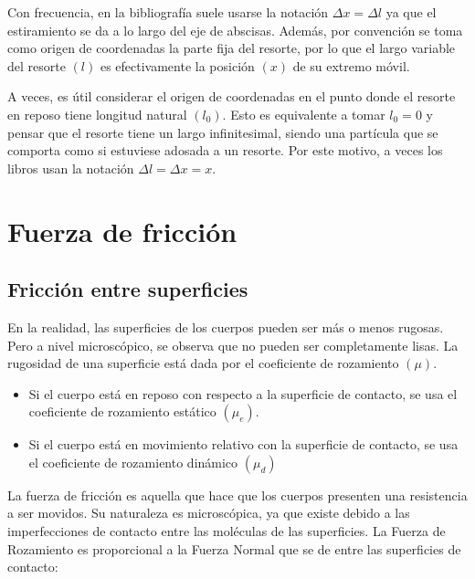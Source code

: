 \documentclass[a5paper,12pt,twoside]{book}
\begin{document}
Con frecuencia, en la bibliografía suele usarse la notación $\Delta x=\Delta l$ ya que el estiramiento se da a lo largo del eje de abscisas. Además, por convención se toma como origen de coordenadas la parte fija del resorte, por lo que el largo variable del resorte $(l)$ es efectivamente la posición $(x)$ de su extremo móvil.

A veces, es útil considerar el origen de coordenadas en el punto donde el resorte en reposo tiene longitud natural $(l_0)$. Esto es equivalente a tomar $l_0 = 0$ y pensar que el resorte tiene un largo infinitesimal, siendo una partícula que se comporta como si estuviese adosada a un resorte. Por este motivo, a veces los libros usan la notación $\Delta l = \Delta x = x$.


\section{Fuerza de fricción}

\subsection{Fricción entre superficies}

En la realidad, las superficies de los cuerpos pueden ser más o menos rugosas. Pero a nivel microscópico, se observa que no pueden ser completamente lisas. La rugosidad de una superficie está dada por el coeficiente de rozamiento $(\mu)$.

\begin{itemize}
    \item  Si el cuerpo está en reposo con respecto a la superficie de contacto, se usa el coeficiente de rozamiento   estático $(\mu_e)$.
    
    \item Si el cuerpo está en movimiento relativo con la superficie de contacto, se usa el coeficiente de rozamiento   dinámico $(\mu_d)$
\end{itemize}

\begin{center}
    \def\svgwidth{0.8\linewidth}
    
\end{center}

La fuerza de fricción es aquella que hace que los cuerpos presenten una resistencia a ser movidos. Su naturaleza es microscópica, ya que existe debido a las imperfecciones de contacto entre las moléculas de las superficies. La Fuerza de Rozamiento es proporcional a la Fuerza Normal que se de entre las superficies de contacto:
\end{document}
